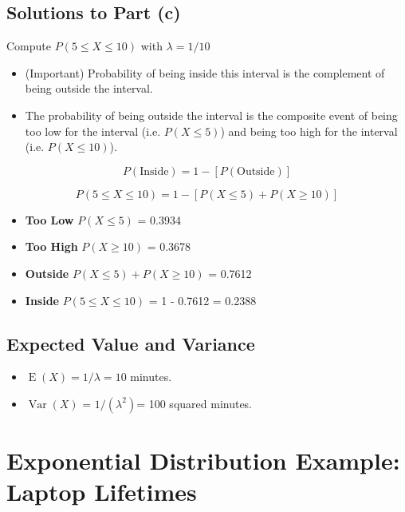 \documentclass[a4paper,12pt]{article}
\begin{document}
\subsection*{Solutions to Part (c)}


Compute $P(5 \leq X \leq 10)$ with $\lambda = 1/10$  \\
\vspace{0.3cm}
\begin{itemize}
	\item (Important) Probability of being inside this interval is the complement of being outside the interval.
	\item The probability of being outside the interval is the composite event of being too low for the interval (i.e. $P( X \leq 5)$)
	and being too high for the interval (i.e. $P( X \leq 10)$).
\end{itemize}

\[ P(\mbox{Inside}) = 1 - \left[ P(\mbox{Outside})  \right] \]

\[ P(5 \leq X \leq 10) = 1 - \left[ P( X \leq 5) + P( X \geq 10)  \right] \]

\begin{itemize}
\item \textbf{Too Low} $P(X \leq 5)$ = 0.3934
\vspace{0.2cm}
\item \textbf{Too High} $P(X \geq 10)$ = 0.3678
\vspace{0.2cm}
\item \textbf{Outside} $P( X \leq 5) + P( X \geq 10)$ = 0.7612
\vspace{0.2cm}
\item \textbf{Inside} $P(5 \leq X \leq 10)$ = 1 - 0.7612 = 0.2388
\end{itemize}

\subsection*{Expected Value and Variance}

\begin{itemize}
    \item $\operatorname{E}(X) = 1/\lambda = 10$ minutes.
    \item $\operatorname{Var}(X)$ = $1/(\lambda^2)$= 100 squared minutes.
\end{itemize}

\newpage




\section*{Exponential Distribution Example: Laptop Lifetimes}
\end{document}
